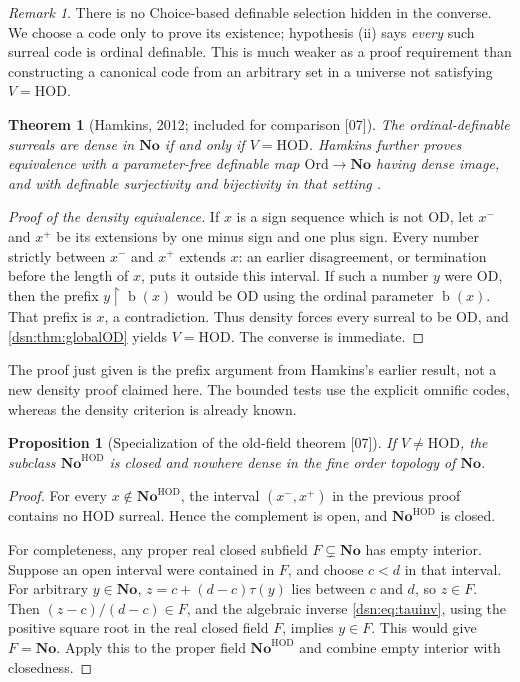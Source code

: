 \documentclass[11pt,a4paper]{article}
\numberwithin{equation}{section}
\newtheorem{theorem}{Theorem}[section]
\newtheorem{proposition}[proposition]{Proposition}
\theoremstyle{definition}
\theoremstyle{remark}
\newtheorem{remark}[remark]{Remark}
\newcommand{\No}{\mathbf{No}}
\newcommand{\Ord}{\mathrm{Ord}}
\newcommand{\OD}{\mathrm{OD}}
\newcommand{\HOD}{\mathrm{HOD}}
\newcommand{\bd}{\operatorname{b}}
\newcommand{\res}{\mathbin{\upharpoonright}}
\newcommand{\src}[1]{\textup{\textsf{\small[#1]}}}
\begin{document}
\begin{remark}
There is no Choice-based definable selection hidden in the converse.
We choose a code only to prove its existence; hypothesis (ii) says
\emph{every} such surreal code is ordinal definable. This is much
weaker as a proof requirement than constructing a canonical code from
an arbitrary set in a universe not satisfying $V=\HOD$.
\end{remark}

\begin{theorem}[Hamkins, 2012; included for comparison \src{07}]\label{dsn:thm:hamkins}
The ordinal-definable surreals are dense in $\No$ if and only if $V=\HOD$.
Hamkins further proves equivalence with a parameter-free definable map
$\Ord\to\No$ having dense image, and with definable surjectivity and
bijectivity in that setting \cite{HamkinsDensity}.
\end{theorem}
\begin{proof}[Proof of the density equivalence]
If $x$ is a sign sequence which is not $\OD$, let $x^-$ and $x^+$ be its
extensions by one minus sign and one plus sign. Every number strictly
between $x^-$ and $x^+$ extends $x$: an earlier disagreement, or
termination before the length of $x$, puts it outside this interval. If
such a number $y$ were $\OD$, then the prefix $y\res\bd(x)$ would be $\OD$
using the ordinal parameter $\bd(x)$. That prefix is $x$, a contradiction.
Thus density forces every surreal to be $\OD$, and
\cref{dsn:thm:globalOD} yields $V=\HOD$. The converse is immediate.
\end{proof}

The proof just given is the prefix argument from Hamkins's earlier result,
not a new density proof claimed here. The bounded tests use the explicit
omnific codes, whereas the density criterion is already known.

\begin{proposition}[Specialization of the old-field theorem \src{07}]\label{dsn:prop:hod-topology}
If $V\ne\HOD$, the subclass $\No^{\HOD}$ is closed and nowhere dense in the
fine order topology of $\No$.
\end{proposition}
\begin{proof}
For every $x\notin\No^{\HOD}$, the interval $(x^-,x^+)$ in the previous
proof contains no $\HOD$ surreal. Hence the complement is open, and
$\No^{\HOD}$ is closed.

For completeness, any proper real closed subfield $F\subsetneq\No$ has
empty interior. Suppose an open interval were contained in $F$, and choose
$c<d$ in that interval. For arbitrary $y\in\No$, $z=c+(d-c)\tau(y)$ lies
between $c$ and $d$, so $z\in F$. Then $(z-c)/(d-c)\in F$, and the algebraic
inverse \eqref{dsn:eq:tauinv}, using the positive square root in the real
closed field $F$, implies $y\in F$. This would give $F=\No$. Apply this to
the proper field $\No^{\HOD}$ and combine empty interior with closedness.
\end{proof}
\end{document}
